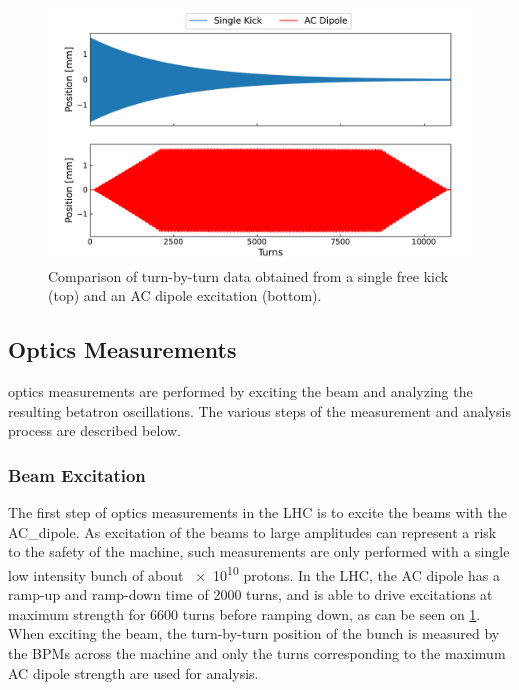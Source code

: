 \begin{figure}[!htb]
  \centering
  \includegraphics*[width=\linewidth]{Figures/Optics_Measurements_Corrections_at_LHC/kick_vs_acdipole.pdf}
  \caption{Comparison of turn-by-turn data obtained from a single free kick (top) and an AC dipole excitation (bottom).}
  \label{figure:kick_vs_acdipole_tbt}
\end{figure}

\subsection{Optics Measurements}
\label{subsection:optics_measurements}

\Gls{optics} measurements are performed by exciting the beam and analyzing the resulting betatron oscillations.
The various steps of the measurement and analysis process are described below.

\subsubsection*{Beam Excitation}

The first step of optics measurements in the LHC is to excite the beams with the \gls{AC_dipole}.
As excitation of the beams to large amplitudes can represent a risk to the safety of the machine, such measurements are only performed with a single low intensity bunch of about \num{e10} protons.
In the LHC, the AC dipole has a ramp-up and ramp-down time of \num{2000} turns, and is able to drive excitations at maximum strength for \num{6600} turns before ramping down, as can be seen on \cref{figure:kick_vs_acdipole_tbt}.
When exciting the beam, the turn-by-turn position of the bunch is measured by the \glspl{BPM} across the machine and only the turns corresponding to the maximum AC dipole strength are used for analysis.


